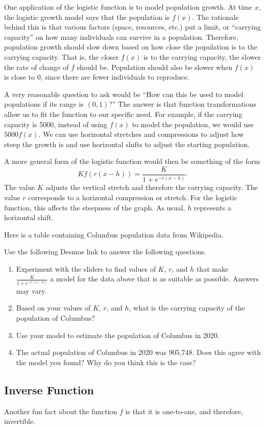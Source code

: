 \documentclass{ximera}
\begin{document}
One application of the logistic function is to model population growth. At time $x$, the logistic growth model says that the population is $f(x)$. The rationale behind this is that various factors (space, resources, etc.) put a limit, or ``carrying capacity'' on how many individuals can survive in a population. Therefore, population growth should slow down based on how close the population is to the carrying capacity. That is, the closer $f(x)$ is to the carrying capacity, the slower the rate of change of $f$ should be. Population should also be slower when $f(x)$ is close to 0, since there are fewer individuals to reproduce. 

A very reasonable question to ask would be ``How can this be used to model populations if its range is $(0, 1)$?'' The answer is that function transformations allow us to fit the function to our specific need. For example, if the carrying capacity is 5000, instead of using $f(x)$ to model the population, we would use $5000f(x)$. We can use horizontal stretches and compressions to adjust how steep the growth is and use horizontal shifts to adjust the starting population. 

A more general form of the logistic function would then be something of the form $$Kf(r(x - h)) = \frac{K}{1 + e^{-r(x - h)}}.$$ The value $K$ adjusts the vertical stretch and therefore the carrying capacity. The value $r$ corresponds to a horizontal compression or stretch. For the logistic function, this affects the steepness of the graph. As usual, $h$ represents a horizontal shift. 

\begin{exploration}
Here is a table containing Columbus population data from Wikipedia. 


Use the following Desmos link to answer the following questions. 
\begin{center}
\end{center}
\begin{enumerate}[label=\alph*.]
\item Experiment with the sliders to find values of $K$, $r$, and $h$ that make $\frac{K}{1 + e^{-r(x - h)}}$ a model for the data above that is as suitable as possible. Answers may vary. 
\item Based on your values of $K$, $r$, and $h$, what is the carrying capacity of the population of Columbus?
\item Use your model to estimate the population of Columbus in 2020. 
\item The actual population of Columbus in 2020 was 905,748. Does this agree with the model you found? Why do you think this is the case?
\end{enumerate}

\end{exploration}

\subsection{Inverse Function}
Another fun fact about the function $f$ is that it is one-to-one, and therefore, invertible. 
\end{document}
